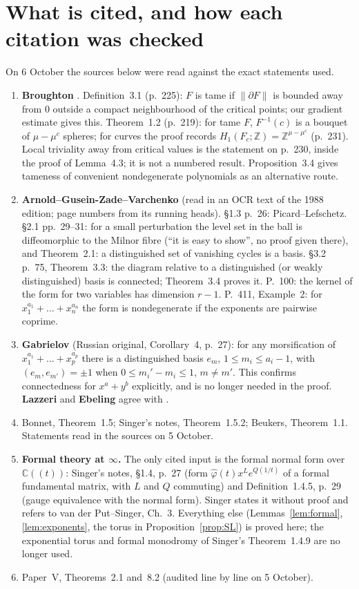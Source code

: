 \documentclass[11pt]{article}
\numberwithin{equation}{section}
\theoremstyle{definition}
\theoremstyle{remark}
\newcommand{\C}{\mathbb C}\newcommand{\Q}{\mathbb Q}\newcommand{\R}{\mathbb R}\newcommand{\Z}{\mathbb Z}
\begin{document}
\section{What is cited, and how each citation was checked}\label{sec:inputs}
On 6 October the sources below were read against the exact statements used.
\begin{enumerate}[leftmargin=2.2em]
\item \textbf{Broughton} \cite{Br}. Definition~3.1 (p.~225): $F$ is tame if
 $\|\partial F\|$ is bounded away from $0$ outside a compact neighbourhood of
 the critical points; our gradient estimate gives this. Theorem~1.2 (p.~219):
 for tame $F$, $F^{-1}(c)$ is a bouquet of $\mu-\mu^c$ spheres; for curves the
 proof records $H_1(F_c;\Z)=\Z^{\mu-\mu^c}$ (p.~231). Local triviality away from
 critical values is the statement on p.~230, inside the proof of Lemma~4.3;
 it is not a numbered result. Proposition~3.4 gives tameness of convenient
 nondegenerate polynomials as an alternative route.
\item \textbf{Arnold--Gusein-Zade--Varchenko} \cite{AGV} (read in an OCR text of
 the 1988 edition; page numbers from its running heads). \S1.3 p.~26:
 Picard--Lefschetz. \S2.1 pp.~29--31: for a small perturbation the level set in
 the ball is diffeomorphic to the Milnor fibre (``it is easy to show'', no
 proof given there), and Theorem~2.1: a distinguished set of vanishing cycles
 is a basis. \S3.2 p.~75, Theorem~3.3: the diagram relative to a distinguished
 (or weakly distinguished) basis is connected; Theorem~3.4 proves it. P.~100:
 the kernel of the form for two variables has dimension $r-1$. P.~411,
 Example~2: for $x_1^{a_1}+\dots+x_n^{a_n}$ the form is nondegenerate if the
 exponents are pairwise coprime.
\item \textbf{Gabrielov} \cite{Ga} (Russian original, Corollary~4, p.~27): for
 any morsification of $x_1^{a_1}+\dots+x_p^{a_p}$ there is a distinguished basis
 $e_m$, $1\le m_i\le a_i-1$, with $(e_m,e_{m'})=\pm1$ when
 $0\le m_i'-m_i\le1$, $m\ne m'$. This confirms connectedness for $x^a+y^b$
 explicitly, and is no longer needed in the proof. \textbf{Lazzeri} \cite{La}
 and \textbf{Ebeling} \cite[Theorem~17, Corollary~18]{Eb} agree with
 \cite[Theorem~3.3]{AGV}.
\item Bonnet, Theorem~1.5; Singer's notes, Theorem~1.5.2; Beukers,
 Theorem~1.1. Statements read in the sources on 5 October.
\item \textbf{Formal theory at $\infty$.} The only cited input is the formal
 normal form over $\C((t))$: Singer's notes, \S1.4, p.~27 (form
 $\hat\varphi(t)x^Le^{Q(1/t)}$ of a formal fundamental matrix, with $L$ and $Q$
 commuting) and Definition~1.4.5, p.~29 (gauge equivalence with the normal
 form). Singer states it without proof and refers to van der Put--Singer,
 Ch.~3. Everything else (Lemmas~\ref{lem:formal}, \ref{lem:exponents}, the
 torus in Proposition~\ref{prop:SL}) is proved here; the exponential torus and
 formal monodromy of Singer's Theorem~1.4.9 are no longer used.
\item Paper~V, Theorems~2.1 and~8.2 (audited line by line on 5 October).
\end{enumerate}
\end{document}

